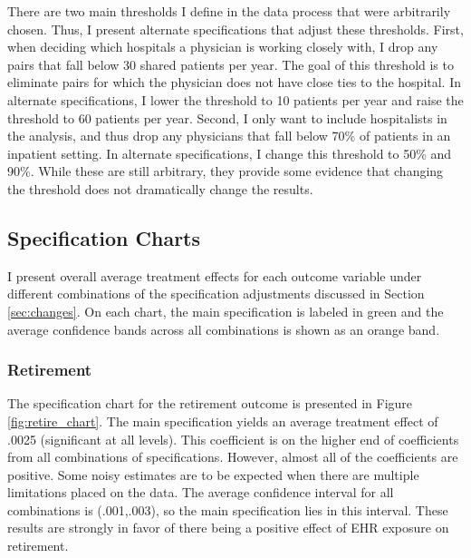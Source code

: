 \documentclass[12pt]{article}
\begin{document}
There are two main thresholds I define in the data process that were arbitrarily chosen. Thus, I present alternate specifications that adjust these thresholds. First, when deciding which hospitals a physician is working closely with, I drop any pairs that fall below 30 shared patients per year. The goal of this threshold is to eliminate pairs for which the physician does not have close ties to the hospital. In alternate specifications, I lower the threshold to 10 patients per year and raise the threshold to 60 patients per year. Second, I only want to include hospitalists in the analysis, and thus drop any physicians that fall below 70\% of patients in an inpatient setting. In alternate specifications, I change this threshold to 50\% and 90\%. While these are still arbitrary, they provide some evidence that changing the threshold does not dramatically change the results. 


\subsection{Specification Charts}\label{sec:chart}

I present overall average treatment effects for each outcome variable under different combinations of the specification adjustments discussed in Section \ref{sec:changes}. On each chart, the main specification is labeled in green and the average confidence bands across all combinations is shown as an orange band. 

\subsubsection{Retirement}

The specification chart for the retirement outcome is presented in Figure \ref{fig:retire_chart}. The main specification yields an average treatment effect of .0025 (significant at all levels). This coefficient is on the higher end of coefficients from all combinations of specifications. However, almost all of the coefficients are positive. Some noisy estimates are to be expected when there are multiple limitations placed on the data. The average confidence interval for all combinations is (.001,.003), so the main specification lies in this interval. These results are strongly in favor of there being a positive effect of EHR exposure on retirement. 
\end{document}
